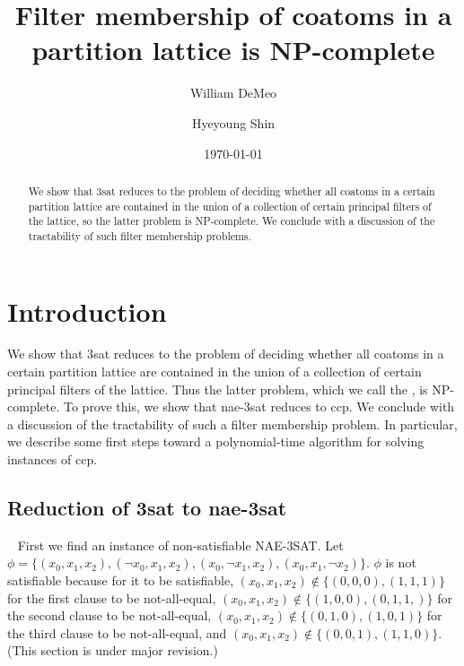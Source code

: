 \documentclass[12pt]{amsart}
\numberwithin{equation}{section}
\theoremstyle{plain}
\theoremstyle{definition}
\newcommand{\ccp}{\acs{ccp}\xspace}
\newcommand{\sat}{\acs{sat}\xspace}
\newcommand{\nae}{\acs{nae}\xspace}
\newcommand{\NP}{\acs{NP}\xspace}
\begin{document}
\title[NP-completeness of coatom counting]{Filter membership of coatoms
  in a\\ partition lattice is NP-complete}
\date{\today}
\author[W.~DeMeo]{William DeMeo}
\address{University of Hawaii}

\author[H.~Shin]{Hyeyoung Shin}
\address{University of Hawaii}


\maketitle

\begin{abstract}
We show that 3\sat %
reduces to the problem of deciding whether all coatoms in a certain partition
lattice are contained in the union of a collection of certain principal filters
of the lattice, so the latter problem is \NP-complete.
We conclude with a discussion of the tractability of
such filter membership problems.
\end{abstract}

\section{Introduction}
\label{sec:introduction}
We show that 3\sat %
reduces to the problem of deciding whether all coatoms in a certain partition
lattice are contained in the union of a collection of certain principal filters
of the lattice. Thus the latter problem, which we call the
, is \NP-complete.
To prove this, we show that \nae-3\sat reduces to \ccp.
We conclude with a discussion of the tractability of
such a filter membership problem. In particular, we describe some first steps
toward a polynomial-time algorithm for solving instances of \ccp.

\subsection{Reduction of 3\sat to \nae-3\sat}
~
First we find an instance of non-satisfiable NAE-3SAT. Let $\phi =
\{(x_0, x_1, x_2), (\neg x_0, x_1, x_2), (x_0, \neg x_1, x_2), (x_0,
x_1, \neg x_2)\}$. $\phi$ is not satisfiable because for it to be
satisfiable, $(x_0, x_1, x_2) \notin \{ (0,0,0), (1,1,1)\}$ for the
first clause to be not-all-equal, $(x_0, x_1, x_2) \notin \{(1,0,0),
(0,1,1,)\}$ for the second clause to be not-all-equal, $(x_0, x_1,
x_2) \notin \{ (0,1,0), (1,0,1)\}$ for the third clause to be
not-all-equal, and $(x_0, x_1, x_2) \notin \{(0,0,1), (1,1,0)\}$.
\vskip1cm
(This section is under major revision.)
\end{document}
